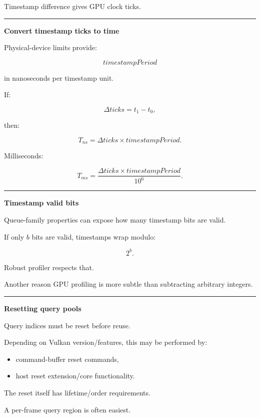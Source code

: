 Timestamp difference gives GPU clock ticks.

\begin{center}\rule{0.5\linewidth}{0.5pt}\end{center}

\textbf{Convert timestamp ticks to time}

Physical-device limits provide:

\[
timestampPeriod
\]

in nanoseconds per timestamp unit.

If:

\[
\Delta ticks=
t_1-t_0,
\]

then:

\[
\boxed{
T_{ns}
=
\Delta ticks
\times
timestampPeriod.
}
\]

Milliseconds:

\[
T_{ms}
=
\frac{
\Delta ticks\times timestampPeriod
}{
10^6
}.
\]

\begin{center}\rule{0.5\linewidth}{0.5pt}\end{center}

\textbf{Timestamp valid bits}

Queue-family properties can expose how many timestamp bits are valid.

If only \(b\) bits are valid, timestamps wrap modulo:

\[
2^b.
\]

Robust profiler respects that.

Another reason GPU profiling is more subtle than subtracting arbitrary integers.

\begin{center}\rule{0.5\linewidth}{0.5pt}\end{center}

\textbf{Resetting query pools}

Query indices must be reset before reuse.

Depending on Vulkan version/features, this may be performed by:

\begin{itemize}
\tightlist
\item
  command-buffer reset commands,
\item
  host reset extension/core functionality.
\end{itemize}

The reset itself has lifetime/order requirements.

A per-frame query region is often easiest.

